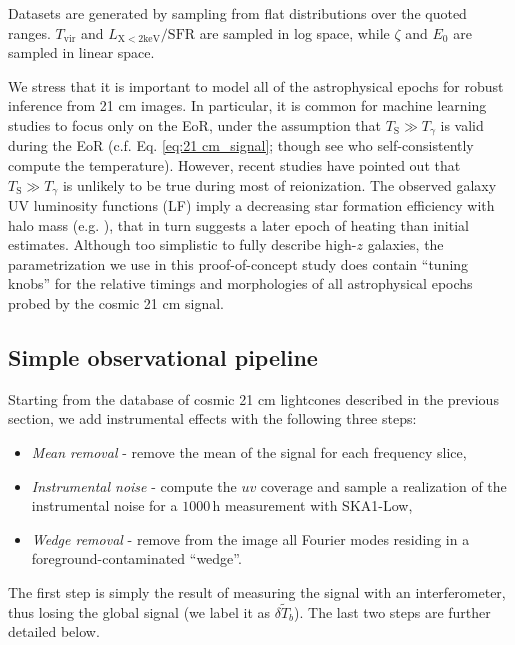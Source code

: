 \documentclass[fleqn,usenatbib]{mnras}
\begin{document}
 Datasets are generated by sampling from flat distributions over the quoted ranges. $T_{\mathrm{vir}}$ and $L_{\mathrm{X<2keV}}/\mathrm{SFR}$ are sampled in log space, while $\zeta$ and $E_0$ are sampled in linear space.

We stress that it is important to model all of the astrophysical epochs for robust inference from 21 cm images.  In particular, it is common for  machine learning studies to focus only on the EoR, under the assumption that  $T_\mathrm{S} \gg T_\gamma$ is valid during the EoR (c.f. Eq. \ref{eq:21 cm_signal}; though see \citealt{gillet19, HMV20} who self-consistently compute the temperature).  However, recent studies have pointed out that $T_\mathrm{S} \gg T_\gamma$ is unlikely to be true during most of reionization.  The observed galaxy UV luminosity functions (LF) imply a decreasing star formation efficiency with halo mass (e.g. \citealt{mirocha17, park20}), that in turn suggests a later epoch of heating than initial estimates.  Although too simplistic to fully describe high-$z$ galaxies, the parametrization we use in this proof-of-concept study does contain ``tuning knobs'' for the relative timings and morphologies of all astrophysical epochs probed by the cosmic 21 cm signal.


\subsection{Simple observational pipeline} \label{sec:obs}
Starting from the database of cosmic 21 cm lightcones described in the previous section, we add instrumental effects with the following three steps:
\begin{itemize}
    \item {\it Mean removal} - remove the mean of the signal for each frequency slice,
    \item {\it Instrumental noise} - compute the $uv$ coverage and sample a realization of the instrumental noise for a $1000 \, \mathrm{h}$ measurement with SKA1-Low,
    \item {\it Wedge removal} - remove from the image all Fourier modes residing in a foreground-contaminated ``wedge''.
\end{itemize}

The first step is simply the result of measuring the signal with an interferometer, thus losing the  global signal (we label it as $\delta \widetilde{T}_b$). The last two steps are further detailed below.
\end{document}
